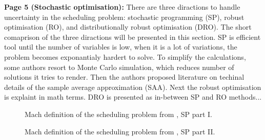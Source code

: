     \textbf{Page 5 (Stochastic optimisation):}
    There are three diractions to handle uncertainty in the scheduling problem: stochastic programming (SP), robust optimisation (RO), and distributionally robust optimisation (DRO). The short comaprison of the three diractions will be presented in this section. SP is efficient tool until the number of variables is low, when it is a lot of variations, the problem becomes exponantialy hardert to solve. To simplify the calculations, some authors resort to Monte Carlo simulation, which reduces number of solutions it tries to render. Then the authors proposed literature on techinal details of the sample average approximation (SAA). Next the robust optimisation is explaint in math terms. DRO is presented as in-between SP and RO methods...  
    \begin{figure}[H]
        \centering
        \caption{Mach definition of the scheduling problem from \cite{x335}, SP part I.}
        \label{fig4:0015_SR04US22}
    \end{figure}
    \begin{figure}[H]
        \centering
        \caption{Mach definition of the scheduling problem from \cite{x335}, SP part II.}
        \label{fig5:0015_SR04US22}
    \end{figure}
